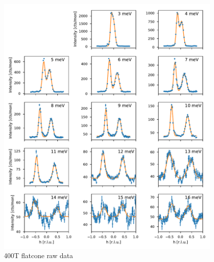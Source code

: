 \begin{figure}
    \centering
    \includegraphics[width=\textwidth]{fig/lowen/fits_400T.pdf}
    \caption[400T flatcone raw data]{400T flatcone raw data}
    \label{fig:flatcone_phonons_400T_raw}    
\end{figure}

